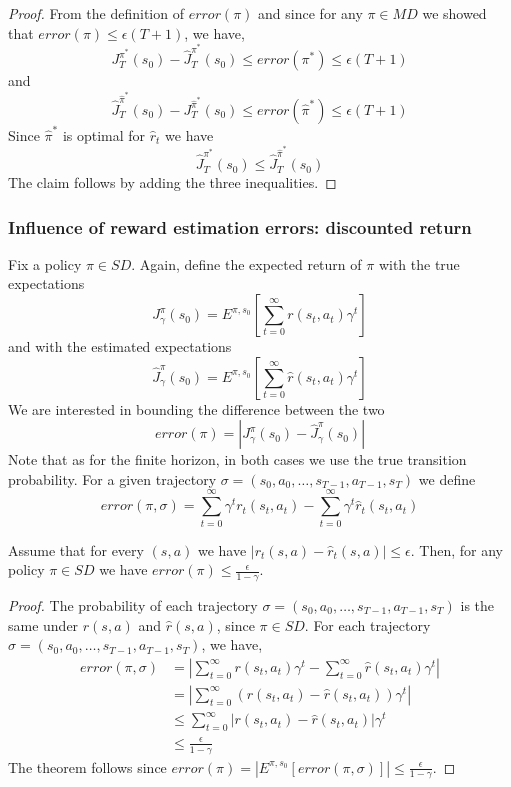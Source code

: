 \begin{proof}
From the definition of $error(\pi)$ and since for any $\pi\in MD$ we
showed that $error(\pi)\leq \epsilon(T+1)$, we have,
\[
J^{\pi^*}_T(s_0)- \widehat{J}^{\pi^*}_T(s_0)\leq error(\pi^*)\leq
\epsilon(T+1)
\]
and
\[
\widehat{J}^{\widehat{\pi}^*}_T(s_0)- J^{\widehat{\pi}^*}_T(s_0)\leq
error(\widehat{\pi}^*)\leq \epsilon(T+1)
\]
Since $\widehat{\pi}^*$ is optimal for $\widehat{r}_t$ we have
\[
\widehat{J}^{\pi^*}_T(s_0)\leq \widehat{J}^{\widehat{\pi}^*}_T(s_0)
\]
The claim follows by adding the three inequalities.
\end{proof}


\subsubsection{Influence of reward estimation errors: discounted return}

Fix a policy $\pi\in SD$. Again, define the expected return of $\pi$
with the true expectations
\[
J^\pi_\gamma(s_0)=E^{\pi,s_0}[\sum_{t=0}^\infty r(s_t,a_t)\gamma^t]
\]
and with the estimated expectations
\[
\widehat{J}^\pi_\gamma(s_0)=E^{\pi,s_0}[\sum_{t=0}^\infty
\widehat{r}(s_t,a_t)\gamma^t ]
\]
We are interested in bounding the difference between the two
\[
error(\pi)=|J^\pi_\gamma(s_0)-\widehat{J}^\pi_\gamma(s_0)|
\]
Note that as for the finite horizon, in both cases we use the true transition probability.
For a given trajectory $\sigma=(s_0,a_0,\ldots, s_{T-1},a_{T-1},s_T)$ we define
\[
error(\pi,\sigma)= \sum_{t=0}^\infty \gamma^t r_t(s_t,a_t)- \sum_{t=0}^\infty
\gamma^t \hat{r}_t(s_t,a_t)
\]

\begin{theorem}
Assume that for every $(s,a)$ we have $|r_t(s,a)-\widehat{r}_t(s,a)|\leq
\epsilon$. Then, for any policy $\pi\in SD$ we have $error(\pi)\leq
\frac{\epsilon}{1-\gamma}$.
\end{theorem}

\begin{proof}
The probability of each trajectory $\sigma=(s_0,a_0,\ldots, s_{T-1},a_{T-1},s_T)$ is the same under $r(s,a)$ and
$\widehat{r}(s,a)$, since $\pi\in SD$. For each trajectory $\sigma=(s_0,a_0,\ldots, s_{T-1},a_{T-1},s_T)$, we have,
\begin{align*}
error(\pi,\sigma)&=|\sum_{t=0}^\infty r(s_t,a_t)\gamma^t -\sum_{t=0}^\infty
\widehat{r}(s_t,a_t)\gamma^t | \\
&= |\sum_{t=0}^\infty (r(s_t,a_t)-\widehat{r}(s_t,a_t))\gamma^t |\\
&\leq \sum_{t=0}^\infty |r(s_t,a_t)-\widehat{r}(s_t,a_t)|\gamma^t \\
&\leq \frac{\epsilon}{1-\gamma}
\end{align*}
The theorem follows since $error(\pi)=|E^{\pi,s_0}[error(\pi,\sigma)]|\leq \frac{\epsilon}{1-\gamma}$.
\end{proof}

